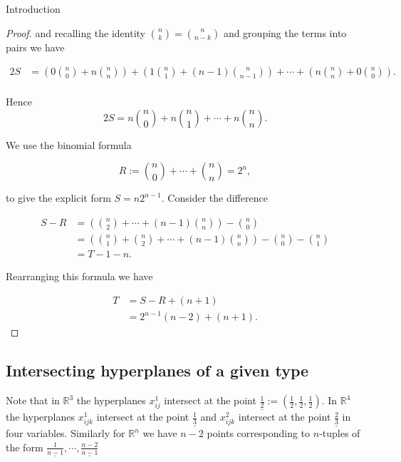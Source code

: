 \documentclass[a4paper,12pt]{article}
\theoremstyle{definition}
\theoremstyle{indented}
\begin{document}
\begin{section}{Introduction}
\begin{proof}
and recalling the identity ${n \choose k} ={n \choose {n-k}} $ and grouping the terms into pairs we have 

\begin{align*}
    2S&= \left( 0 {n \choose 0} + n  {n \choose n} \right) + \left(1 {n \choose 1} + (n-1) {n \choose {n-1}} \right)+ \cdots  + \left( n  {n \choose n} +  0 {n \choose 0} \right).\\
\end{align*}

Hence $$2S = n {n\choose 0} + n {n \choose 1}+ \cdots + n { n \choose n}.$$

We use the binomial formula

$$R:={n \choose 0} + \cdots + {n \choose n} = 2^{n},$$

to give the explicit form  $S=n  2^{n-1}$. Consider the difference


\begin{align*}
    S-R &= \left( {n \choose 2} + \cdots + (n-1) {n\choose n}  \right) - {n \choose 0} \\
&= \left( {n \choose 1} +{n \choose 2} + \cdots + (n-1) {n\choose n}  \right) - {n \choose 0} -{n \choose 1}\\
&= T-1-n.
\end{align*}

Rearranging this formula we have

\begin{align*}
    T&=S-R+(n+1)\\
    &= 2^{n-1} (n-2)+(n+1).
\end{align*}

\end{proof}

\subsection{Intersecting hyperplanes of a given type} 


Note that in $\mathbb{R}^3$ the hyperplanes $x_{ij}^1$ intersect at the point  $\underline{\frac{1}{2}}:=(\frac{1}{2},\frac{1}{2},\frac{1}{2})$. In $\mathbb{R}^4$ the hyperplanes $x_{ijk}^1$ intersect at the point $\underline{\frac{1}{3}}$ and $x_{ijk}^2$ intersect at the point $\underline{\frac{2}{3}}$ in four variables. Similarly for $\mathbb{R}^n$ we have $n-2$ points corresponding to $n$-tuples of the form $\underline{\frac{1}{n-1}}, \cdots ,\underline{\frac{n-2}{n-1}}$



\end{section}
\end{document}
